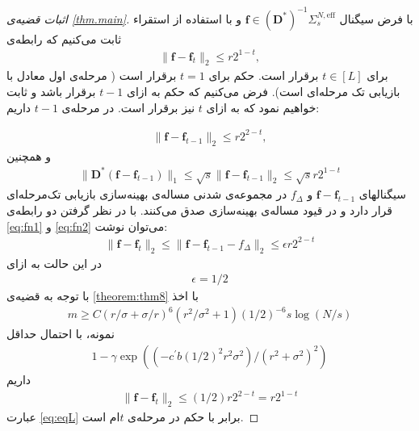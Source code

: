 \begin{proof}[اثبات قضیه‌ی \ref{thm.main}]
با فرض سیگنال
$ \bm{f}\in (\bm{D}^{\ast})^{-1} \Sigma_{s}^{N,\text{eff}} $ 
و با استفاده از استقراء ثابت می‌کنیم که رابطه‌ی
\begin{align}
\|\bm{f}-\bm{f}_{t}\|_{2}\leq  r 2^{1-t},
\end{align}
برای 
$t \in [L]$
برقرار است.
حکم برای 
$t=1$
برقرار است ( مرحله‌ی اول معادل با بازیابی تک مرحله‌ای است). فرض می‌کنیم که حکم به ازای
$t-1$
برقرار باشد و ثابت خواهیم نمود که به ازای 
$t$
نیز برقرار است. در مرحله‌ی
$t-1$
 داریم:

\begin{align}
\label{eq:fn1}
\|\bm{f}-\bm{f}_{t-1}\|_{2}\leq  r 2^{2-t},
\end{align}
و همچنین
\begin{align}
\label{eq:fn2}
\|\bm{D}^{\ast}(\bm{f}-\bm{f}_{t-1})\|_{1} \leq  \sqrt{s} \|\bm{f}-\bm{f}_{t-1}\|_{2} \leq \sqrt{s} r 2^{1-t}
\end{align}
سیگنالهای
$\bm{f}-\bm{f}_{t-1}$
و
$f_{\varDelta}$
در مجموعه‌ی شدنی مساله‌ی بهینه‌سازی بازیابی تک‌مرحله‌ای قرار دارد و در قیود مساله‌ی بهینه‌سازی صدق می‌کنند.
با در نظر گرفتن دو رابطه‌ی 
\eqref{eq:fn1}
و
\eqref{eq:fn2}
می‌توان نوشت:
\begin{align}
\label{eq:fn3}
\|\bm{f}-\bm{f}_{t}\|_{2} \leq \|\bm{f}-\bm{f}_{t-1}-f_{\varDelta}\|_{2} \leq \epsilon  r 2^{2-t}
\end{align}
در این حالت به ازای
\begin{align}
\label{eq:fn4}
\epsilon = 1/2
\end{align}
 با توجه به قضیه‌ی
\ref{theorem:thm8}
با اخذ
\begin{align}
m \geq C(r/\sigma+\sigma/r)^{6}(r^{2}/\sigma^{2}+1)(1/2)^{-6} s \log(N/s)
\end{align}
نمونه، با احتمال حداقل
\begin{align}
1-\gamma \exp((-c^{\prime} b (1/2)^{2} r^{2}\sigma^{2})/(r^{2}+\sigma^{2})^{2})
\end{align}
داریم
\begin{align}
\label{eq:eqL}
\| \bm{f}-\bm{f}_{t}\|_{2} \leq (1/2) r 2^{2-t}=  r 2^{1-t}
\end{align}
عبارت 
\eqref{eq:eqL}
برابر با حکم در مرحله‌ی
$t$ام
است. 
\end{proof}